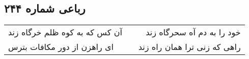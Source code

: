 \begin{center}
\section*{رباعی شماره ۲۴۴}
\label{sec:sh244}
\begin{longtable}{l p{0.5cm} r}
آن کس که به کوه ظلم خرگاه زند
&&
خود را به دم آه سحرگاه زند
\\
ای راهزن از دور مکافات بترس
&&
راهی که زنی ترا همان راه زند
\\
\end{longtable}
\end{center}

